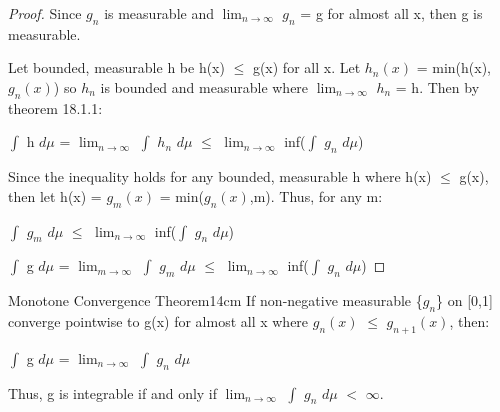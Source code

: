     \begin{proof}
        Since $g_n$ is measurable and $\lim_{n \rightarrow \infty}$ $g_n$ = g
        for almost all x, then g is measurable.

        Let bounded, measurable h be h(x) $\leq$ g(x) for all x.
        Let $h_n(x)$ = min(h(x),$g_n(x)$) so $h_n$ is bounded and measurable
        where $\lim_{n \rightarrow \infty}$ $h_n$ = h.
        Then by {\color{red} theorem 18.1.1}:

        \hspace{0.5cm}
        $\int$ h $d\mu$
        = $\lim_{n \rightarrow \infty}$ $\int$ $h_n$ $d\mu$
        $\leq$ $\lim_{n \rightarrow \infty}$ inf($\int$ $g_n$ $d\mu$)

        Since the inequality holds for any bounded, measurable h
        where h(x) $\leq$ g(x), then let h(x) = $g_m(x)$ = min($g_n(x)$,m).
        Thus, for any m:

        \hspace{0.5cm}
        $\int$ $g_m$ $d\mu$
        $\leq$ $\lim_{n \rightarrow \infty}$ inf($\int$ $g_n$ $d\mu$)

        \hspace{0.5cm}
        $\int$ g $d\mu$
        = $\lim_{m \rightarrow \infty}$ $\int$ $g_m$ $d\mu$
        $\leq$ $\lim_{n \rightarrow \infty}$ inf($\int$ $g_n$ $d\mu$)
    \end{proof}

    \vspace{0.5cm}



    \begin{wtheorem}{Monotone Convergence Theorem}{14cm}
        If non-negative measurable \{$g_n$\} on [0,1]
        converge pointwise to g(x) for almost all x where
        $g_n(x)$ $\leq$ $g_{n+1}(x)$, then:

        \hspace{0.5cm}
        $\int$ g $d\mu$ = $\lim_{n \rightarrow \infty}$ $\int$ $g_n$ $d\mu$

        Thus, g is integrable if and only if
        $\lim_{n \rightarrow \infty}$ $\int$ $g_n$ $d\mu$ $<$ $\infty$.
    \end{wtheorem}

